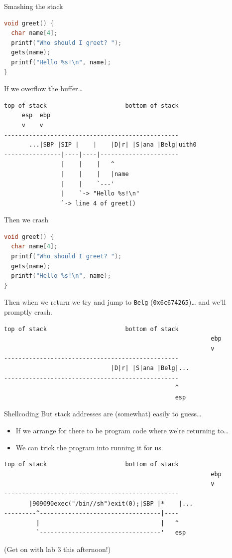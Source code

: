 \documentclass[9pt,aspectratio=169]{beamer}
\begin{document}
\begin{frame}[label={sec:org0bc5ac3},fragile]{Smashing the stack}
 \begin{lstlisting}[language=C,numbers=none]
void greet() {
  char name[4];
  printf("Who should I greet? ");
  gets(name);
  printf("Hello %s!\n", name);
}
\end{lstlisting}

If we overflow the buffer\ldots{}

\begin{verbatim}
top of stack                      bottom of stack
     esp  ebp
     v    v
-------------------------------------------------
       ...|SBP |SIP |    |    |D|r| |S|ana |Belg|uith0
----------------|----|----|----------------------
                |    |    |   ^
                |    |    |   |name
                |    |    `---'
                |    `-> "Hello %s!\n"    
                `-> line 4 of greet()
\end{verbatim}
\end{frame}
\begin{frame}[label={sec:org708c02b},fragile]{Then we crash}
 \begin{lstlisting}[language=C,numbers=none]
void greet() {
  char name[4];
  printf("Who should I greet? ");
  gets(name);
  printf("Hello %s!\n", name);
}
\end{lstlisting}

Then when we return we try and jump to \texttt{Belg} (\texttt{0x6c674265})\ldots{} and we'll promptly crash.

\begin{verbatim}
top of stack                      bottom of stack
                                                          ebp
                                                          v
-------------------------------------------------
                              |D|r| |S|ana |Belg|...
-------------------------------------------------
                                                ^
                                                esp
\end{verbatim}
\end{frame}
\begin{frame}[label={sec:org6655955},fragile]{Shellcoding}
 But stack addresses are (somewhat) easily to guess\ldots{}
\begin{itemize}
\item If we arrange for there to be program code where we're returning to\ldots{}
\item We can trick the program into running it for us.
\end{itemize}

\begin{verbatim}
top of stack                      bottom of stack
                                                          ebp
                                                          v
-------------------------------------------------
       |909090exec("/bin//sh")exit(0);|SBP |*    |...
---------^----------------------------------|----
         |                                  |   ^
         `----------------------------------'   esp
\end{verbatim}

(Get on with lab 3 this afternoon!)
\end{frame}
\end{document}
